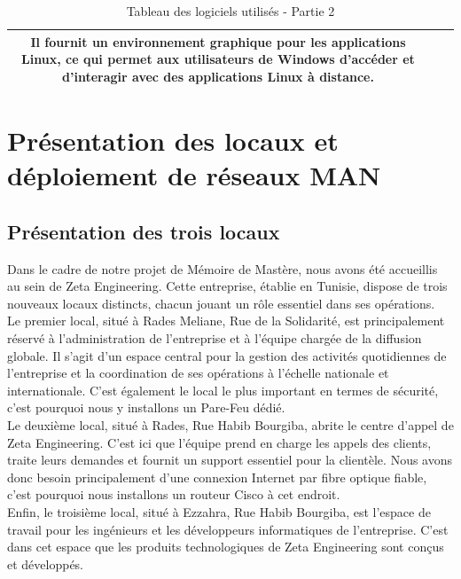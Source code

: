 \begin{table}[H]
\begin{center}
\begin{tabular}{|c{3cm}|c{3cm}|l{10cm}|}
Il fournit un environnement graphique pour les applications Linux, ce qui permet aux utilisateurs de Windows d'accéder et d'interagir avec des applications Linux à distance. \\
\hline
\end{tabular}
\caption{Tableau des logiciels utilisés - Partie 2}
\label{1}
\end{center}
\end{table}


\section{Présentation des locaux et déploiement de réseaux MAN}
\subsection{Présentation des trois locaux}

Dans le cadre de notre projet de Mémoire de Mastère, nous avons été accueillis au sein de Zeta Engineering. Cette entreprise, établie en Tunisie, dispose de trois nouveaux locaux distincts, chacun jouant un rôle essentiel dans ses opérations. \\

Le premier local, situé à Rades Meliane, Rue de la Solidarité, est principalement réservé à l'administration de l'entreprise et à l'équipe chargée de la diffusion globale. Il s'agit d'un espace central pour la gestion des activités quotidiennes de l'entreprise et la coordination de ses opérations à l'échelle nationale et internationale. C'est également le local le plus important en termes de sécurité, c'est pourquoi nous y installons un Pare-Feu dédié. \\

Le deuxième local, situé à Rades, Rue Habib Bourgiba, abrite le centre d'appel de Zeta Engineering. C'est ici que l'équipe prend en charge les appels des clients, traite leurs demandes et fournit un support essentiel pour la clientèle. Nous avons donc besoin principalement d'une connexion Internet par fibre optique fiable, c'est pourquoi nous installons un routeur Cisco à cet endroit. \\

Enfin, le troisième local, situé à Ezzahra, Rue Habib Bourgiba, est l'espace de travail pour les ingénieurs et les développeurs informatiques de l'entreprise. C'est dans cet espace que les produits technologiques de Zeta Engineering sont conçus et développés. \\

